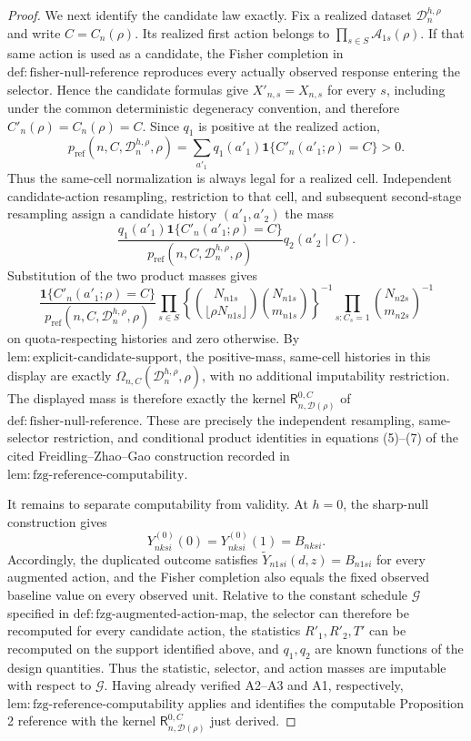 \documentclass{article}
\begin{document}
\begin{proof}
We next identify the candidate law exactly.  Fix a realized dataset \(\mathcal D_n^{h,\rho}\) and write \(C=C_n(\rho)\).  Its realized first action belongs to \(\prod_{s\in S}\mathcal A_{1s}(\rho)\).  If that same action is used as a candidate, the Fisher completion in \(\mathrm{def{:}fisher\mbox{-}null\mbox{-}reference}\) reproduces every actually observed response entering the selector.  Hence the candidate formulas give \(X'_{n,s}=X_{n,s}\) for every \(s\), including under the common deterministic degeneracy convention, and therefore \(C'_n(\rho)=C_n(\rho)=C\).  Since \(q_1\) is positive at the realized action,
\[
p_{\mathrm{ref}}(n,C,\mathcal D_n^{h,\rho},\rho)
=\sum_{a'_1}q_1(a'_1)\mathbf 1\{C'_n(a'_1;\rho)=C\}>0.
\]
Thus the same-cell normalization is always legal for a realized cell.  Independent candidate-action resampling, restriction to that cell, and subsequent second-stage resampling assign a candidate history \((a'_1,a'_2)\) the mass
\[
\frac{q_1(a'_1)\mathbf 1\{C'_n(a'_1;\rho)=C\}}
{p_{\mathrm{ref}}(n,C,\mathcal D_n^{h,\rho},\rho)}
q_2(a'_2\mid C).
\]
Substitution of the two product masses gives
\[
\frac{\mathbf 1\{C'_n(a'_1;\rho)=C\}}
{p_{\mathrm{ref}}(n,C,\mathcal D_n^{h,\rho},\rho)}
\prod_{s\in S}
\left\{
\binom{N_{n1s}}{\lfloor\rho N_{n1s}\rfloor}
\binom{N_{n1s}}{m_{n1s}}
\right\}^{-1}
\prod_{s:C_s=1}\binom{N_{n2s}}{m_{n2s}}^{-1}
\]
on quota-respecting histories and zero otherwise.  By \(\mathrm{lem{:}explicit\mbox{-}candidate\mbox{-}support}\), the positive-mass, same-cell histories in this display are exactly \(\Omega_{n,C}(\mathcal D_n^{h,\rho},\rho)\), with no additional imputability restriction.  The displayed mass is therefore exactly the kernel \(\mathsf R_{n,\mathcal D(\rho)}^{0,C}\) of \(\mathrm{def{:}fisher\mbox{-}null\mbox{-}reference}\).  These are precisely the independent resampling, same-selector restriction, and conditional product identities in equations (5)--(7) of the cited Freidling--Zhao--Gao construction recorded in \(\mathrm{lem{:}fzg\mbox{-}reference\mbox{-}computability}\).

It remains to separate computability from validity.  At \(h=0\), the sharp-null construction gives
\[
Y^{(0)}_{nksi}(0)=Y^{(0)}_{nksi}(1)=B_{nksi}.
\]
Accordingly, the duplicated outcome satisfies \(\widetilde Y_{n1si}(d,z)=B_{n1si}\) for every augmented action, and the Fisher completion also equals the fixed observed baseline value on every observed unit.  Relative to the constant schedule \(\mathcal G\) specified in \(\mathrm{def{:}fzg\mbox{-}augmented\mbox{-}action\mbox{-}map}\), the selector can therefore be recomputed for every candidate action, the statistics \(R'_1,R'_2,T'\) can be recomputed on the support identified above, and \(q_1,q_2\) are known functions of the design quantities.  Thus the statistic, selector, and action masses are imputable with respect to \(\mathcal G\).  Having already verified A2--A3 and A1, respectively, \(\mathrm{lem{:}fzg\mbox{-}reference\mbox{-}computability}\) applies and identifies the computable Proposition 2 reference with the kernel \(\mathsf R_{n,\mathcal D(\rho)}^{0,C}\) just derived.


\end{proof}
\end{document}

